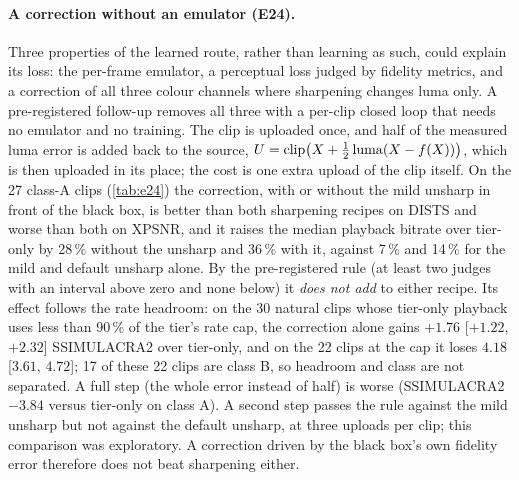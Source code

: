 \paragraph{A correction without an emulator (E24).}
Three properties of the learned route, rather than learning as such, could explain its loss: the
per-frame emulator, a perceptual loss judged by fidelity metrics, and a correction of all three
colour channels where sharpening changes luma only. A pre-registered follow-up removes all three
with a per-clip closed loop that needs no emulator and no training. The clip is uploaded once, and
half of the measured luma error is added back to the source,
$U = \operatorname{clip}\bigl(X + \tfrac{1}{2}\operatorname{luma}(X - f(X))\bigr)$,
which is then uploaded in its place; the cost is one extra upload of the clip itself. On the 27
class-A clips (\cref{tab:e24}) the correction, with or without the mild unsharp in front of the
black box, is better than both sharpening recipes on DISTS and worse than both on XPSNR, and it
raises the median playback bitrate over tier-only by 28\,\% without the unsharp and 36\,\% with
it, against 7\,\% and 14\,\% for the mild and default unsharp alone. By the pre-registered rule (at least two judges with an interval
above zero and none below) it \emph{does not add} to either recipe. Its effect follows the rate
headroom: on the 30 natural clips whose tier-only playback uses less than 90\,\% of the tier's rate
cap, the correction alone gains $+1.76$ [$+1.22$, $+2.32$] SSIMULACRA2 over tier-only, and on the 22
clips at the cap it loses $4.18$ [$3.61$, $4.72$]; 17 of these 22 clips are class B, so headroom
and class are not separated. A full step (the whole error instead of half) is worse (SSIMULACRA2
$-3.84$ versus tier-only on class A). A second step passes the rule against the mild unsharp but
not against the default unsharp, at three uploads per clip; this comparison was exploratory. A
correction driven by the black box's own fidelity error therefore does not beat sharpening either.

